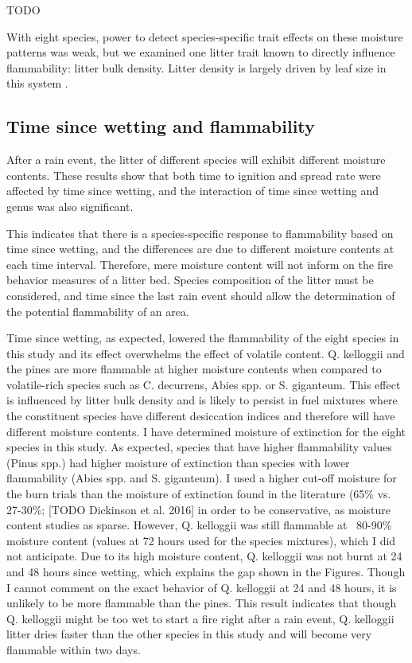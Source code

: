 \documentclass[fire,article,submit,moreauthors,pdftex]{Definitions/mdpi}
\begin{document}
TODO

With eight species, power to detect species-specific trait effects on these moisture patterns was weak, but we examined one litter trait known to directly influence flammability: litter bulk density. Litter density is largely driven by leaf size in this system \cite{Magalhaes+Schwilk-2012}. 

\subsection{Time since wetting and flammability}

After a rain event, the litter of different species will exhibit different moisture contents. These results show that both time to ignition and spread rate were affected by time since wetting, and the interaction of time since wetting and genus was also significant.

This indicates that there is a species-specific response to flammability based on time since wetting, and the differences are due to different moisture contents at each time interval. Therefore, mere moisture content will not inform on the fire behavior measures of a litter bed. Species composition of the litter must be considered, and time since the last rain event should allow the determination of the potential flammability of an area. 

Time since wetting, as expected, lowered the flammability of the eight species in this study and its effect overwhelms the effect of volatile content. Q. kelloggii and the pines are more flammable at higher moisture contents when compared to volatile-rich species such as C. decurrens, Abies spp. or S. giganteum. This effect is influenced by litter bulk density and is likely to persist in fuel mixtures where the constituent species have different desiccation indices and therefore will have different moisture contents. I have determined moisture of extinction for the eight species in this study. As expected, species that have higher flammability values (Pinus spp.) had higher moisture of extinction than species with lower flammability (Abies spp. and S. giganteum). I used a higher cut-off moisture for the burn trials than the moisture of extinction found in the literature (65\% vs. 27-30\%; \citep{ Rothermel-1972} [TODO Dickinson et al. 2016] in order to be conservative, as moisture content studies as sparse. However, Q. kelloggii was still flammable at ~80-90\% moisture content (values at 72 hours used for the species mixtures), which I did not anticipate. Due to its high moisture content, Q. kelloggii was not burnt at 24 and 48 hours since wetting, which explains the gap shown in the Figures. Though I cannot comment on the exact behavior of Q. kelloggii at 24 and 48 hours, it is unlikely to be more flammable than the pines. This result indicates that though Q. kelloggii might be too wet to start a fire right after a rain event, Q. kelloggii litter dries faster than the other species in this study and will become very flammable within two days.
\end{document}
